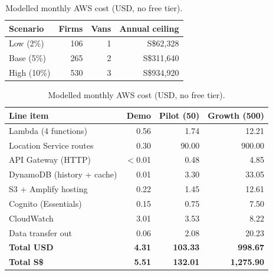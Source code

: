 \documentclass[10.5pt,a4paper]{article}
\newcommand{\Sd}{S\$}
\begin{document}
\begin{table}[h]
\centering\footnotesize
\setlength{\tabcolsep}{3.5pt}
\begin{minipage}[t]{0.37\linewidth}\centering
\caption{Illustrative addressable subscription revenue.}\label{tab:market}
\begin{tabular}{@{}lrrr@{}}
\toprule
Scenario & Firms & Vans & Annual ceiling \\
\midrule
Low (2\%) & 106 & 1 & \Sd62,328 \\
Base (5\%) & 265 & 2 & \Sd311,640 \\
High (10\%) & 530 & 3 & \Sd934,920 \\
\bottomrule
\end{tabular}
\end{minipage}\hfill
\begin{minipage}[t]{0.61\linewidth}\centering
\caption{Modelled monthly AWS cost (USD, no free tier).}\label{tab:aws}
\begin{tabular}{@{}lrrr@{}}
\toprule
Line item & Demo & Pilot (50) & Growth (500) \\
\midrule
Lambda (4 functions) & 0.56 & 1.74 & 12.21 \\
Location Service routes & 0.30 & 90.00 & 900.00 \\
API Gateway (HTTP) & $<$0.01 & 0.48 & 4.85 \\
DynamoDB (history + cache) & 0.01 & 3.30 & 33.05 \\
S3 + Amplify hosting & 0.22 & 1.45 & 12.61 \\
Cognito (Essentials) & 0.15 & 0.75 & 7.50 \\
CloudWatch & 3.01 & 3.53 & 8.22 \\
Data transfer out & 0.06 & 2.08 & 20.23 \\
\midrule
\textbf{Total USD} & \textbf{4.31} & \textbf{103.33} & \textbf{998.67} \\
\textbf{Total \Sd} & \textbf{5.51} & \textbf{132.01} & \textbf{1,275.90} \\
\bottomrule
\end{tabular}
\end{minipage}
\end{table}
\end{document}

